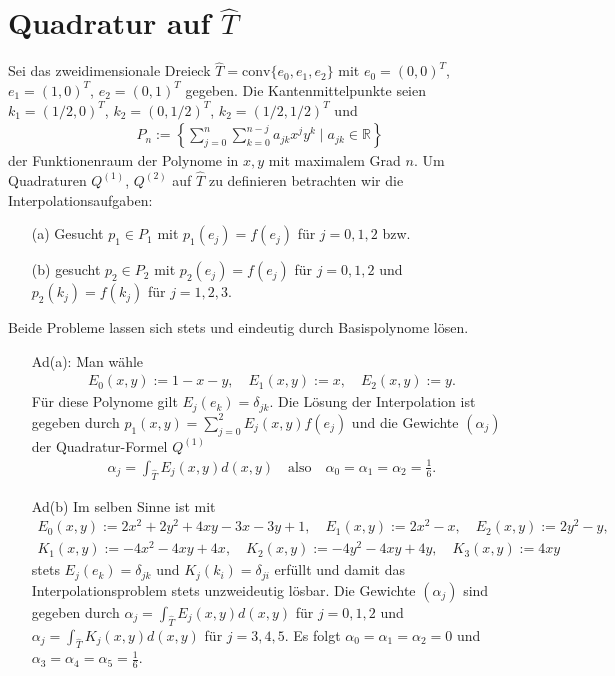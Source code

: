 \documentclass[french, 12pt, a4paper, onesided]{scrartcl}
\theoremstyle{plain}
\theoremstyle{definition}
\theoremstyle{remark}
\newcommand{\R}{\mathbb{R}}
\begin{document}
\section{Quadratur auf $ \hat{T} $}
Sei das zweidimensionale Dreieck $ \hat{T}=\text{conv}\{ e_0,e_1,e_2 \} $ mit $ e_0=(0,0)^T $, $ e_1=(1,0)^T $, $ e_2=(0,1)^T $ gegeben. Die Kantenmittelpunkte seien $ k_1=(1/2,0)^T $, $ k_2=(0,1/2)^T $, $ k_2=(1/2,1/2)^T $ und
\begin{align*}
	P_n:=\left\lbrace \sum_{j=0}^{n}\sum_{k=0}^{n-j}a_{jk} x^j y^k \mid a_{jk}\in\R \right\rbrace 
\end{align*} 
der Funktionenraum der Polynome in $ x,y $ mit maximalem Grad $ n $.
\newline
Um Quadraturen $ Q^{(1)} $, $ Q^{(2)} $ auf $ \hat{T} $ zu definieren betrachten wir die Interpolationsaufgaben:
\begin{itemize}
	\item[(a)] Gesucht $ p_1\in P_1 $ mit $ p_1(e_j)=f(e_j) $ für $ j=0,1,2 $ bzw.
	\item[(b)] gesucht $ p_2\in P_2 $ mit $ p_2(e_j)=f(e_j) $ für $ j=0,1,2 $ und $ p_2(k_j)=f(k_j) $ für $ j=1,2,3 $.
\end{itemize}
Beide Probleme lassen sich stets und eindeutig durch Basispolynome lösen.
\begin{itemize}
	\item[Ad(a):] Man wähle
	\begin{align*}
		E_0(x,y):=1-x-y, \quad E_1(x,y):=x, \quad E_2(x,y):=y.
	\end{align*}
	Für diese Polynome gilt $ E_j(e_k)=\delta_{jk} $. Die Lösung der Interpolation ist gegeben durch $ p_1(x,y)=\sum_{j=0}^{2}E_j(x,y)f(e_j) $ und die Gewichte $ (\alpha_j) $ der Quadratur-Formel $ Q^{(1)} $
	\begin{align*}
		\alpha_j= \int_{\hat{T}} E_j(x,y) d(x,y) \quad \text{also} \quad \alpha_0=\alpha_1=\alpha_2=\frac{1}{6}.
	\end{align*}
	\item[Ad(b)] Im selben Sinne ist mit
	\begin{align*}
		E_0(x,y):=2x^2+2y^2+4xy-3x-3y+1, \quad E_1(x,y):=2x^2-x, \quad E_2(x,y):=2y^2-y, \\
		K_1(x,y):=-4x^2-4xy+4x, \quad K_2(x,y):=-4y^2-4xy+4y, \quad K_3(x,y):=4xy
	\end{align*}
	stets $ E_j(e_k)=\delta_{jk} $ und $ K_j(k_i)=\delta_{ji} $ erfüllt und damit das Interpolationsproblem stets unzweideutig lösbar. Die Gewichte $ (\alpha_j) $ sind gegeben durch $ \alpha_j=\int_{\hat{T}} E_j(x,y) d(x,y) $ für $ j=0,1,2 $ und $ \alpha_j=\int_{\hat{T}} K_j(x,y) d(x,y) $ für $ j=3,4,5 $. Es folgt $ \alpha_0=\alpha_1=\alpha_2=0 $ und $ \alpha_3=\alpha_4=\alpha_5=\frac{1}{6} $.
\end{itemize}
\end{document}
